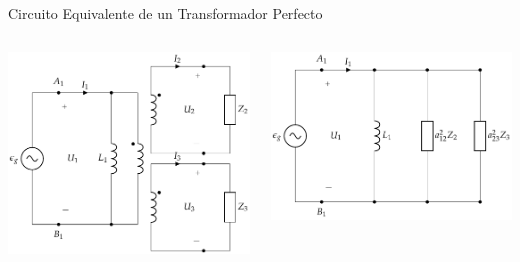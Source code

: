 \documentclass[aspectratio=169, usenames,svgnames,dvipsnames]{beamer}
\begin{document}
\begin{frame}[label={sec:org16d7821}]{Circuito Equivalente de un Transformador Perfecto}
\begin{columns}
\begin{column}{0.5\columnwidth}
\begin{center}
\includegraphics[width=\textwidth]{../figs/TrafoPerfectoIdealVariosDevanados_Impedancia.pdf}
\end{center}
\end{column}

\begin{column}{0.5\columnwidth}
\begin{center}
\includegraphics[width=\textwidth]{../figs/TrafoPerfectoVariosDevanados_Impedancia_Equivalente.pdf}
\end{center}
\end{column}
\end{columns}
\end{frame}
\end{document}
